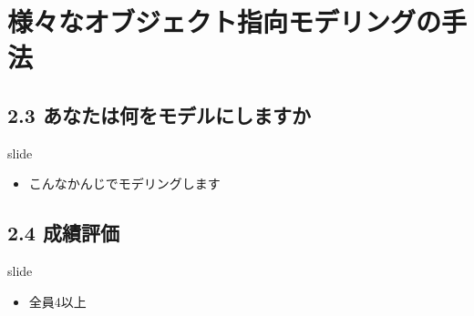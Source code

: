 \documentclass[t]{beamer}
\begin{document}
\section{様々なオブジェクト指向モデリングの手法}
\label{sec-2-2}
\subsection{2.3 あなたは何をモデルにしますか}
\label{sec-2-2-1}
\begin{frame}[label=sec-2-2-1-1]{slide}
\begin{itemize}
\item こんなかんじでモデリングします
\end{itemize}
\end{frame}
\subsection{2.4 成績評価}
\label{sec-2-2-2}
\begin{frame}[label=sec-2-2-2-1]{slide}
\begin{itemize}
\item 全員4以上
\end{itemize}
\end{frame}
\end{document}
